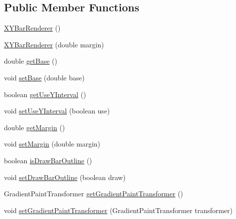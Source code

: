 \subsection*{Public Member Functions}
\begin{DoxyCompactItemize}
\item 
\mbox{\hyperlink{classorg_1_1jfree_1_1chart_1_1renderer_1_1xy_1_1_x_y_bar_renderer_aee585e05f8764cd20d6cc9f86e61e2fc}{X\+Y\+Bar\+Renderer}} ()
\item 
\mbox{\hyperlink{classorg_1_1jfree_1_1chart_1_1renderer_1_1xy_1_1_x_y_bar_renderer_ac0edebd83e1b420b5a939fa59dbb3f51}{X\+Y\+Bar\+Renderer}} (double margin)
\item 
double \mbox{\hyperlink{classorg_1_1jfree_1_1chart_1_1renderer_1_1xy_1_1_x_y_bar_renderer_a8d8a8dbb9dfd5028a0fc790a494b780a}{get\+Base}} ()
\item 
void \mbox{\hyperlink{classorg_1_1jfree_1_1chart_1_1renderer_1_1xy_1_1_x_y_bar_renderer_ad0902f54cf21048caccba61885f0f30d}{set\+Base}} (double base)
\item 
boolean \mbox{\hyperlink{classorg_1_1jfree_1_1chart_1_1renderer_1_1xy_1_1_x_y_bar_renderer_a5202439a21afc475365e7462e9a9e660}{get\+Use\+Y\+Interval}} ()
\item 
void \mbox{\hyperlink{classorg_1_1jfree_1_1chart_1_1renderer_1_1xy_1_1_x_y_bar_renderer_af327f26a4813ff9cd15872b48a184042}{set\+Use\+Y\+Interval}} (boolean use)
\item 
double \mbox{\hyperlink{classorg_1_1jfree_1_1chart_1_1renderer_1_1xy_1_1_x_y_bar_renderer_afe1667467a6b42816f9a3bad2373e3b7}{get\+Margin}} ()
\item 
void \mbox{\hyperlink{classorg_1_1jfree_1_1chart_1_1renderer_1_1xy_1_1_x_y_bar_renderer_a724b6d3ddd8fd0fe8d389a88c2084b21}{set\+Margin}} (double margin)
\item 
boolean \mbox{\hyperlink{classorg_1_1jfree_1_1chart_1_1renderer_1_1xy_1_1_x_y_bar_renderer_a734b1bb783b2424117a73eacf43da834}{is\+Draw\+Bar\+Outline}} ()
\item 
void \mbox{\hyperlink{classorg_1_1jfree_1_1chart_1_1renderer_1_1xy_1_1_x_y_bar_renderer_ad3a163a0e30056d5dbbadd3376f80345}{set\+Draw\+Bar\+Outline}} (boolean draw)
\item 
Gradient\+Paint\+Transformer \mbox{\hyperlink{classorg_1_1jfree_1_1chart_1_1renderer_1_1xy_1_1_x_y_bar_renderer_a7ecf5c18565098bb2f49783e5606cf4e}{get\+Gradient\+Paint\+Transformer}} ()
\item 
void \mbox{\hyperlink{classorg_1_1jfree_1_1chart_1_1renderer_1_1xy_1_1_x_y_bar_renderer_aa367f21104094dede9def889bcfd2940}{set\+Gradient\+Paint\+Transformer}} (Gradient\+Paint\+Transformer transformer)

\end{DoxyCompactItemize}
